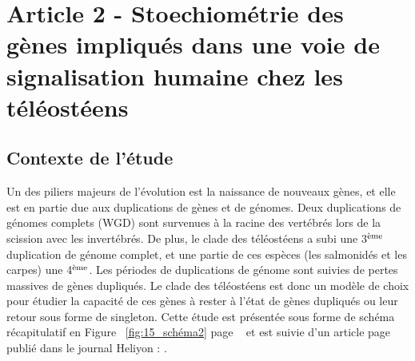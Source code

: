 \chapter[Stoechiométrie des gènes impliqués dans une voie de signalisation humaine chez les téléostéens]{Article 2 - Stoechiométrie des gènes impliqués dans une voie de signalisation humaine chez les téléostéens}
\thispagestyle{firstpage}
\onehalfspacing

\section{Contexte de l'étude}
\par Un des piliers majeurs de l’évolution est la naissance de nouveaux gènes, et elle est en partie due aux duplications de gènes et de génomes. Deux duplications de génomes complets (WGD) sont survenues à la racine des vertébrés lors de la scission avec les invertébrés. De plus, le clade des téléostéens a subi une 3$\textsuperscript{ème}$ duplication de génome complet, et une partie de ces espèces (les salmonidés et les carpes) une 4$\textsuperscript{ème}$. Les périodes de duplications de génome sont suivies de pertes massives de gènes dupliqués. Le clade des téléostéens est donc un modèle de choix pour étudier la capacité de ces gènes à rester à l’état de gènes dupliqués ou leur retour sous forme de singleton. Cette étude est présentée sous forme de schéma récapitulatif en Figure ~\ref{fig:15_schéma2} page ~\pageref{fig:15_schéma2} et est suivie d’un article page \pageref{art2} publié dans le journal Heliyon : \cite{picolo_genes_2023}.

